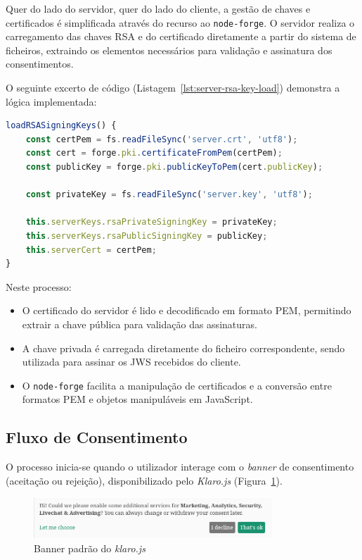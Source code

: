 Quer do lado do servidor, quer do lado do cliente, a gestão de chaves e certificados é simplificada através do recurso ao \texttt{node-forge}. O servidor realiza o carregamento das chaves RSA e do certificado diretamente a partir do sistema de ficheiros, extraindo os elementos necessários para validação e assinatura dos consentimentos.

O seguinte excerto de código (Listagem~\ref{lst:server-rsa-key-load}) demonstra a lógica implementada:

\begin{lstlisting}[language=Javascript, caption={Carregamento das chaves RSA do servidor e do certificado associado}, label={lst:server-rsa-key-load}]
loadRSASigningKeys() {
	const certPem = fs.readFileSync('server.crt', 'utf8');
	const cert = forge.pki.certificateFromPem(certPem);
	const publicKey = forge.pki.publicKeyToPem(cert.publicKey);

	const privateKey = fs.readFileSync('server.key', 'utf8');

	this.serverKeys.rsaPrivateSigningKey = privateKey;
	this.serverKeys.rsaPublicSigningKey = publicKey;
	this.serverCert = certPem;
}
\end{lstlisting}

Neste processo:
\begin{itemize}
    \item O certificado do servidor é lido e decodificado em formato PEM, permitindo extrair a chave pública para validação das assinaturas.
    \item A chave privada é carregada diretamente do ficheiro correspondente, sendo utilizada para assinar os JWS recebidos do cliente.
    \item O \texttt{node-forge} facilita a manipulação de certificados e a conversão entre formatos PEM e objetos manipuláveis em JavaScript.
\end{itemize}

\subsection{Fluxo de Consentimento}

O processo inicia-se quando o utilizador interage com o \textit{banner} de consentimento (aceitação ou rejeição), disponibilizado pelo \textit{Klaro.js} (Figura~\ref{fig:klarojs-banner}).

\begin{figure}[h]
    \centering
	\includegraphics[width=0.8\textwidth]{images/klaro_banner.png}
	\caption{Banner padrão do \textit{klaro.js}}
\label{fig:klarojs-banner}
\end{figure}

